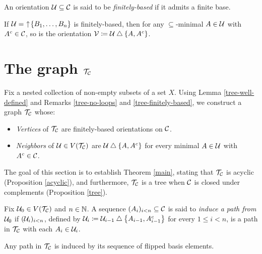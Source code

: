 \documentclass{amsart}
\begin{document}
    \begin{definition}
        An orientation $\mathcal{U}\subseteq\mathcal{C}$ is said to be \textit{finitely-based} if it admits a finite base.
    \end{definition}

    \begin{remark}\label{tree-finitely-based}
        If $\mathcal{U}=\,\,\uparrow\!\left\{B_1,\dots,B_n\right\}$ is finitely-based, then for any $\subseteq$-minimal $A\in\mathcal{U}$ with $A^c\in\mathcal{C}$, so is the orientation $\mathcal{V}\coloneqq\mathcal{U}\bigtriangleup\left\{A,A^c\right\}$. {}
    \end{remark}

    \section{The graph $\mathcal{T}_{\mathcal{C}}$}

    Fix a nested collection of non-empty subsets of a set $X$. Using Lemma \ref{tree-well-defined} and Remarks \ref{tree-no-loops} and \ref{tree-finitely-based}, we construct a graph $\mathcal{T}_{\mathcal{C}}$ whose:
    \begin{itemize}
        \item \textit{Vertices} of $\mathcal{T}_{\mathcal{C}}$ are finitely-based orientations on $\mathcal{C}$.
        \item \textit{Neighbors} of $\mathcal{U}\in V(\mathcal{T}_{\mathcal{C}})$ are $\mathcal{U}\bigtriangleup\left\{A,A^c\right\}$ for every minimal $A\in\mathcal{U}$ with $A^c\in\mathcal{C}$.
    \end{itemize}

    The goal of this section is to establish Theorem \ref{main}, stating that $\mathcal{T}_{\mathcal{C}}$ is acyclic (Proposition \ref{acyclic}), and furthermore, $\mathcal{T}_{\mathcal{C}}$ is a tree when $\mathcal{C}$ is closed under complements (Proposition \ref{tree}).

    \begin{definition}
        Fix $\mathcal{U}_0\in V(\mathcal{T}_{\mathcal{C}})$ and $n\in\mathbb{N}$. A sequence $(A_i)_{i<n}\subseteq\mathcal{C}$ is said to \textit{induce a path from $\mathcal{U}_0$} if $(\mathcal{U}_i)_{i<n}$, defined by $\mathcal{U}_i\coloneqq\mathcal{U}_{i-1}\bigtriangleup\left\{A_{i-1},A_{i-1}^c\right\}$ for every $1\leq i<n$, is a path in $\mathcal{T}_{\mathcal{C}}$ with each $A_i\in\mathcal{U}_i$.
    \end{definition}

    \begin{remark}
        Any path in $\mathcal{T}_{\mathcal{C}}$ is induced by its sequence of flipped basis elements.
    \end{remark}
\end{document}
